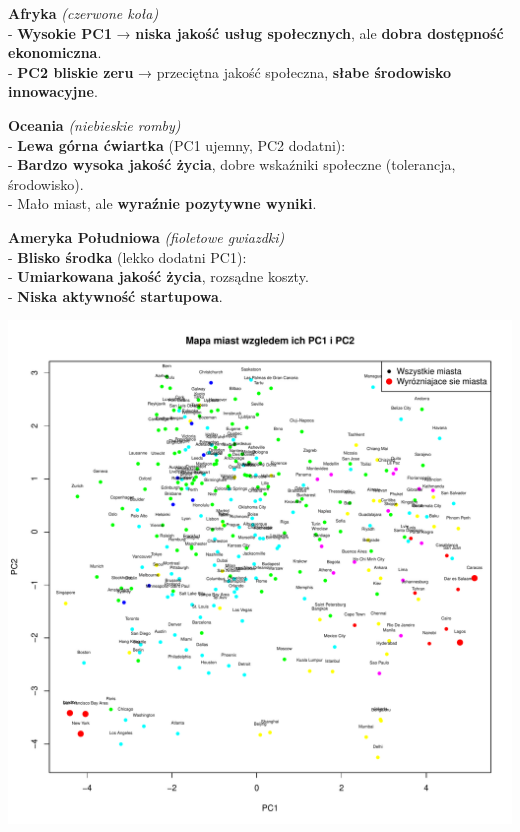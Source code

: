 \documentclass[
  12pt,
]{article}
\begin{document}
\textbf{Afryka} \emph{(czerwone koła)}\\
- \textbf{Wysokie PC1} → \textbf{niska jakość usług społecznych}, ale
\textbf{dobra dostępność ekonomiczna}.\\
- \textbf{PC2 bliskie zeru} → przeciętna jakość społeczna, \textbf{słabe
środowisko innowacyjne}.

\textbf{Oceania} \emph{(niebieskie romby)}\\
- \textbf{Lewa górna ćwiartka} (PC1 ujemny, PC2 dodatni):\\
- \textbf{Bardzo wysoka jakość życia}, dobre wskaźniki społeczne
(tolerancja, środowisko).\\
- Mało miast, ale \textbf{wyraźnie pozytywne wyniki}.

\textbf{Ameryka Południowa} \emph{(fioletowe gwiazdki)}\\
- \textbf{Blisko środka} (lekko dodatni PC1):\\
- \textbf{Umiarkowana jakość życia}, rozsądne koszty.\\
- \textbf{Niska aktywność startupowa}.

\begin{center}\includegraphics{Sprawozdanie2_files/figure-latex/mapa_wyróżniających_się_miast-1} \end{center}
\end{document}
